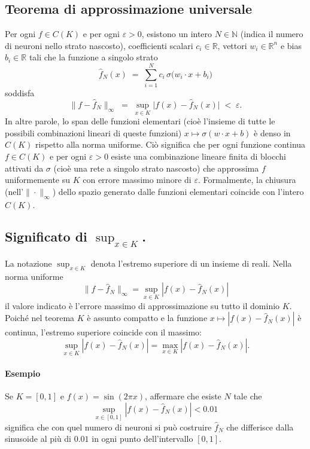 \documentclass[a4paper,12pt]{report}
\begin{document}
	\subsection{Teorema di approssimazione universale}
	Per ogni \(f\in C(K)\) e per ogni \(\varepsilon>0\), esistono un intero \(N\in\mathbb{N}\) (indica il numero di neuroni nello strato nascosto), coefficienti scalari \(c_i\in\mathbb{R}\), vettori \(w_i\in\mathbb{R}^n\) e bias \(b_i\in\mathbb{R}\) tali che la funzione a singolo strato
	\[
	\hat f_N(x) \;=\; \sum_{i=1}^N c_i\,\sigma\bigl(w_i\cdot x + b_i\bigr)
	\]
	soddisfa
	\[
	\|f - \hat f_N\|_\infty \;=\; \sup_{x\in K} \bigl|f(x)-\hat f_N(x)\bigr| \;<\; \varepsilon.
	\]
	In altre parole, lo span delle funzioni elementari (cioè l'insieme di tutte le possibili combinazioni lineari di queste funzioni) \(x\mapsto\sigma(w\cdot x + b)\) è denso in \(C(K)\) rispetto alla norma uniforme. Ciò significa che per ogni funzione continua \(f\in C(K)\) e per ogni \(\varepsilon>0\) esiste una combinazione lineare finita di blocchi attivati da \(\sigma\) (cioè una rete a singolo strato nascosto) che approssima \(f\) uniformemente su \(K\) con errore massimo minore di \(\varepsilon\). Formalmente, la chiusura (nell'\(\|\cdot\|_\infty\)) dello spazio generato dalle funzioni elementari coincide con l'intero \(C(K)\).
	
	\subsection{Significato di \(\sup_{x\in K}\).}
	La notazione \(\sup_{x\in K}\) denota l'estremo superiore di un insieme di reali. Nella norma uniforme
	\[
	\|f-\hat f_N\|_\infty=\sup_{x\in K}|f(x)-\hat f_N(x)|
	\]
	il valore indicato è l'errore massimo di approssimazione su tutto il dominio \(K\). Poiché nel teorema \(K\) è assunto compatto e la funzione \(x\mapsto|f(x)-\hat f_N(x)|\) è continua, l'estremo superiore coincide con il massimo:
	\[
	\sup_{x\in K}|f(x)-\hat f_N(x)|=\max_{x\in K}|f(x)-\hat f_N(x)|.
	\]
	
	\paragraph{Esempio} Se \(K=[0,1]\) e \(f(x)=\sin(2\pi x)\), affermare che esiste \(N\) tale che
	\[
	\sup_{x\in[0,1]}|f(x)-\hat f_N(x)|<0.01
	\]
	significa che con quel numero di neuroni si può costruire \(\hat f_N\) che differisce dalla sinusoide al più di \(0.01\) in ogni punto dell'intervallo \([0,1]\).
	
\end{document}
